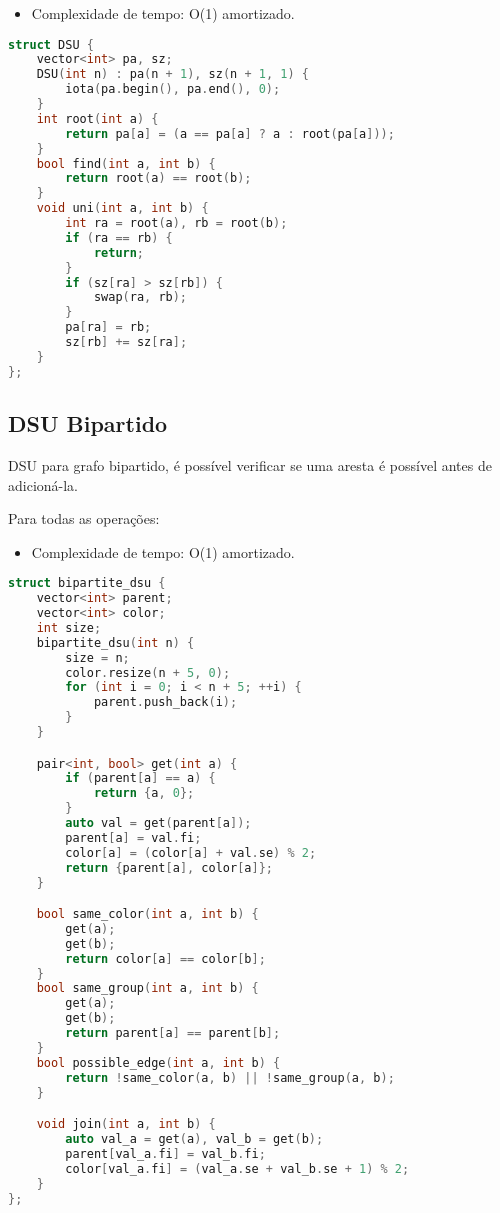 \documentclass[11pt, a4paper, oneside]{book}
\begin{document}
\begin{itemize}
\item Complexidade de tempo: O(1) amortizado.
\end{itemize}

\hfill

\begin{multicols}{2}
\begin{lstlisting}[language=C++]
struct DSU {
    vector<int> pa, sz;
    DSU(int n) : pa(n + 1), sz(n + 1, 1) {
        iota(pa.begin(), pa.end(), 0);
    }
    int root(int a) {
        return pa[a] = (a == pa[a] ? a : root(pa[a]));
    }
    bool find(int a, int b) {
        return root(a) == root(b);
    }
    void uni(int a, int b) {
        int ra = root(a), rb = root(b);
        if (ra == rb) {
            return;
        }
        if (sz[ra] > sz[rb]) {
            swap(ra, rb);
        }
        pa[ra] = rb;
        sz[rb] += sz[ra];
    }
};
\end{lstlisting}
\end{multicols}

\hfill

\subsection{DSU Bipartido}


DSU para grafo bipartido, é possível verificar se uma aresta é possível antes de adicioná-la.  

Para todas as operações:



\begin{itemize}
\item Complexidade de tempo: O(1) amortizado.
\end{itemize}

\hfill

\begin{multicols}{2}
\begin{lstlisting}[language=C++]
struct bipartite_dsu {
    vector<int> parent;
    vector<int> color;
    int size;
    bipartite_dsu(int n) {
        size = n;
        color.resize(n + 5, 0);
        for (int i = 0; i < n + 5; ++i) {
            parent.push_back(i);
        }
    }

    pair<int, bool> get(int a) {
        if (parent[a] == a) {
            return {a, 0};
        }
        auto val = get(parent[a]);
        parent[a] = val.fi;
        color[a] = (color[a] + val.se) % 2;
        return {parent[a], color[a]};
    }

    bool same_color(int a, int b) {
        get(a);
        get(b);
        return color[a] == color[b];
    }
    bool same_group(int a, int b) {
        get(a);
        get(b);
        return parent[a] == parent[b];
    }
    bool possible_edge(int a, int b) {
        return !same_color(a, b) || !same_group(a, b);
    }

    void join(int a, int b) {
        auto val_a = get(a), val_b = get(b);
        parent[val_a.fi] = val_b.fi;
        color[val_a.fi] = (val_a.se + val_b.se + 1) % 2;
    }
};
\end{lstlisting}
\end{multicols}
\end{document}
